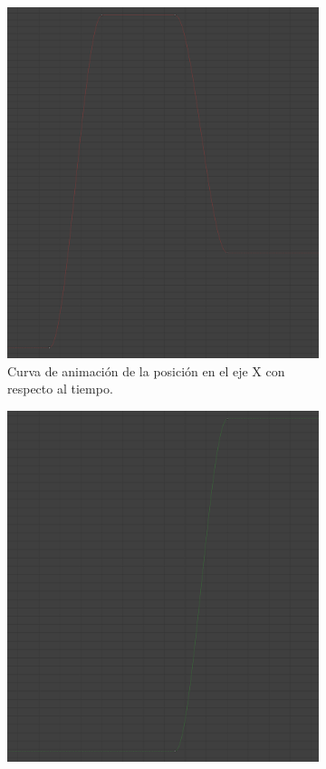 \begin{figure}[H]
    \centering
    \begin{subfigure}[t]{0.32\textwidth}
        \centering
        \includegraphics[width=\textwidth]{imagenes/camara/posX.png}
        \caption{Curva de animación de la posición en el eje X con respecto al tiempo.}
    \end{subfigure}
    \hfill
    \begin{subfigure}[t]{0.32\textwidth}
        \centering
        \includegraphics[width=\textwidth]{imagenes/camara/posY.png}

\end{subfigure}
\end{figure}
